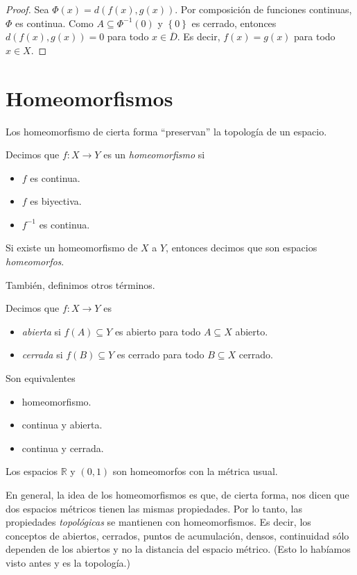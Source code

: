 \begin{proof}
	Sea $\Phi (x) = d(f(x), g(x))$. Por composición de funciones continuas, $\Phi$ es continua. Como $A \subseteq \Phi^{-1}(0)$ y $\left\{ 0 \right\}$ es cerrado, entonces $d(f(x), g(x)) = 0$ para todo $x \in \overline{D}$. Es decir, $f(x) = g(x)$ para todo $x \in X$.
\end{proof}


\section{Homeomorfismos}

Los homeomorfismo de cierta forma ``preservan'' la topología de un espacio.

\begin{definition}
	Decimos que $f : X \to Y$ es un \emph{homeomorfismo} si
	\begin{itemize}
		\item $f$ es continua.
		\item $f$ es biyectiva.
		\item $f^{-1}$ es continua.
	\end{itemize}
	Si existe un homeomorfismo de $X$ a $Y$, entonces decimos que son espacios \emph{homeomorfos}.
\end{definition}

También, definimos otros términos.

\begin{definition}
	Decimos que $f : X \to Y$ es
	\begin{itemize}
		\item \emph{abierta} si $f(A) \subseteq Y$ es abierto para todo $A \subseteq X$ abierto.
		\item \emph{cerrada} si $f(B) \subseteq Y$ es cerrado para todo $B \subseteq X$ cerrado.
	\end{itemize}
\end{definition}

\begin{remark}
	Son equivalentes
	\begin{itemize}
		\item homeomorfismo.
		\item continua y abierta.
		\item continua y cerrada.
	\end{itemize}
\end{remark}

\begin{example}
	Los espacios $\mathbb{R}$ y $(0, 1)$ son homeomorfos con la métrica usual.
\end{example}

En general, la idea de los homeomorfismos es que, de cierta forma, nos dicen que dos espacios métricos tienen las mismas propiedades. Por lo tanto, las propiedades \textit{topológicas} se mantienen con homeomorfismos. Es decir, los conceptos de abiertos, cerrados, puntos de acumulación, densos, continuidad sólo dependen de los abiertos y no la distancia del espacio métrico. (Esto lo habíamos visto antes y es la topología.)




